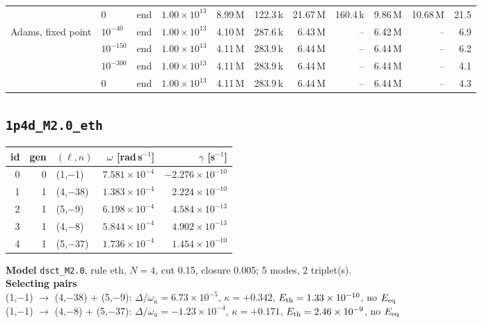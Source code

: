{\begin{tabular}{@{}llllrrrrrrr@{}}
 & $0$ & end & $1.00\times10^{13}$ & 8.99\,M & 122.3\,k & 21.67\,M & 160.4\,k & 9.86\,M & 10.68\,M & 21.5 \\
\addlinespace[2pt]
Adams, fixed point & $10^{-40}$ & end & $1.00\times10^{13}$ & 4.10\,M & 287.6\,k & 6.43\,M & -- & 6.42\,M & -- & 6.9 \\
 & $10^{-150}$ & end & $1.00\times10^{13}$ & 4.11\,M & 283.9\,k & 6.44\,M & -- & 6.44\,M & -- & 6.2 \\
 & $10^{-300}$ & end & $1.00\times10^{13}$ & 4.11\,M & 283.9\,k & 6.44\,M & -- & 6.44\,M & -- & 4.1 \\
 & $0$ & end & $1.00\times10^{13}$ & 4.11\,M & 283.9\,k & 6.44\,M & -- & 6.44\,M & -- & 4.3 \\
\bottomrule
\end{tabular}}

\clearpage
\subsection{\texttt{1p4d\_M2.0\_eth}}\label{net:1p4d_M2.0_eth}
\noindent\begin{minipage}[t]{0.43\textwidth}\vspace{0pt}\footnotesize
\begin{tabular}{@{}rrlrr@{}}
\toprule
id & gen & $(\ell,n)$ & $\omega$ [rad\,s$^{-1}$] & $\gamma$ [s$^{-1}$] \\
\midrule
0 & 0 & (1,$-$1) & $7.581\times10^{-4}$ & $-2.276\times10^{-10}$ \\
1 & 1 & (4,$-$38) & $1.383\times10^{-4}$ & $2.224\times10^{-10}$ \\
2 & 1 & (5,$-$9) & $6.198\times10^{-4}$ & $4.584\times10^{-13}$ \\
3 & 1 & (4,$-$8) & $5.844\times10^{-4}$ & $4.902\times10^{-13}$ \\
4 & 1 & (5,$-$37) & $1.736\times10^{-4}$ & $1.454\times10^{-10}$ \\
\bottomrule
\end{tabular}
\end{minipage}\hfill
\begin{minipage}[t]{0.55\textwidth}\vspace{0pt}\footnotesize
\textbf{Model} \texttt{dsct\_M2.0}, rule eth, $N=4$, cut 0.15,
closure 0.005; 5 modes, 2 triplet(s).\\[2pt]
\textbf{Selecting pairs}\\ (1,$-$1) $\to$ (4,$-$38) + (5,$-$9): $\Delta/\omega_a=6.73\times10^{-5}$, $\kappa=+0.342$, $E_{\rm th}=1.33\times10^{-10}$, no $E_{\rm eq}$\\
(1,$-$1) $\to$ (4,$-$8) + (5,$-$37): $\Delta/\omega_a=-1.23\times10^{-4}$, $\kappa=+0.171$, $E_{\rm th}=2.46\times10^{-9}$, no $E_{\rm eq}$\\[2pt]

\end{minipage}

